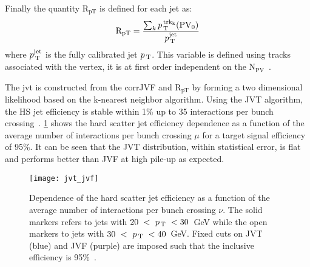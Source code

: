 Finally the quantity $\mathrm{R_{pT}}$ is defined for each jet as:
\begin{equation}
  \label{eq:93}
  \mathrm{R_{pT}} = \frac{\sum_k p_\mathrm{\, T}^\mathrm{\, trk_k}
    (\mathrm{PV_0})}{p_\mathrm{\, T}^{\mathrm{jet}}}
\end{equation}
where $p_\mathrm{\, T}^{\mathrm{jet}}$ is the fully calibrated jet $p_\mathrm{\, T}$. This variable is
defined using tracks associated with the vertex, it is at first order
independent on the N$_{\mathrm{PV}}$~\cite{PileUpPerformance}.

The \gls{jvt} is constructed from the corrJVF and $\mathrm{R_{pT}}$ by forming a
two dimensional likelihood based on the k-nearest neighbor algorithm. Using the
JVT algorithm, the HS jet efficiency is stable within 1\% up to 35 interactions
per bunch crossing~\cite{JVT}. \cref{fig:jvt_jvf} shows the hard scatter jet
efficiency dependence as a function of the average number of interactions per
bunch crossing $\mu$ for a target signal efficiency of 95\%. It can be seen that
the JVT distribution, within statistical error, is flat and performs better than
JVF at high pile-up as expected.
\begin{figure}[!h]
  \centering
    \texttt{[image: jvt\_jvf]}
    \caption{Dependence of the hard scatter jet efficiency as a function of the
      average number of interactions per bunch crossing $\nu$. The solid markers
    refers to jets with $20~<~p_\mathrm{\, T}~<30$~GeV while the open markers to jets with
    $30~<~p_\mathrm{\, T}~<40$~GeV. Fixed cuts on JVT (blue) and JVF (purple) are imposed
    such that the inclusive efficiency is 95\%~\cite{JVT}.}
    \label{fig:jvt_jvf}
\end{figure}
